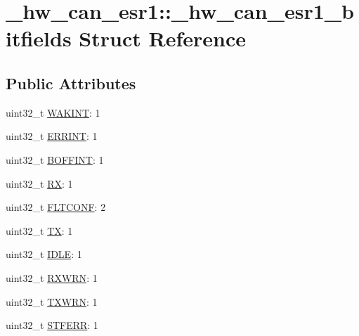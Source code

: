 \hypertarget{struct__hw__can__esr1_1_1__hw__can__esr1__bitfields}{}\section{\+\_\+hw\+\_\+can\+\_\+esr1\+:\+:\+\_\+hw\+\_\+can\+\_\+esr1\+\_\+bitfields Struct Reference}
\label{struct__hw__can__esr1_1_1__hw__can__esr1__bitfields}
\subsection*{Public Attributes}
\begin{DoxyCompactItemize}
\item 
uint32\+\_\+t \hyperlink{struct__hw__can__esr1_1_1__hw__can__esr1__bitfields_af22efeca0789da9a46947084175f9d2e}{W\+A\+K\+I\+NT}\+: 1
\item 
uint32\+\_\+t \hyperlink{struct__hw__can__esr1_1_1__hw__can__esr1__bitfields_a8e27f92e5c072273a0a510ce65bfd703}{E\+R\+R\+I\+NT}\+: 1
\item 
uint32\+\_\+t \hyperlink{struct__hw__can__esr1_1_1__hw__can__esr1__bitfields_a704fb456f255686bf4bac33249747e39}{B\+O\+F\+F\+I\+NT}\+: 1
\item 
uint32\+\_\+t \hyperlink{struct__hw__can__esr1_1_1__hw__can__esr1__bitfields_aeec6fc0114b6c72a218fad63d47f1e59}{RX}\+: 1
\item 
uint32\+\_\+t \hyperlink{struct__hw__can__esr1_1_1__hw__can__esr1__bitfields_a512e48d3fa0df0df9bed93532473d2b6}{F\+L\+T\+C\+O\+NF}\+: 2
\item 
uint32\+\_\+t \hyperlink{struct__hw__can__esr1_1_1__hw__can__esr1__bitfields_a860c19cb8170407bbeaad62dac9d7849}{TX}\+: 1
\item 
uint32\+\_\+t \hyperlink{struct__hw__can__esr1_1_1__hw__can__esr1__bitfields_a29e60f0fa2e201d7b4bccba13fb92568}{I\+D\+LE}\+: 1
\item 
uint32\+\_\+t \hyperlink{struct__hw__can__esr1_1_1__hw__can__esr1__bitfields_a13a042dab7d53725d9dafea386492918}{R\+X\+W\+RN}\+: 1
\item 
uint32\+\_\+t \hyperlink{struct__hw__can__esr1_1_1__hw__can__esr1__bitfields_ab54299ef7bafabf9d29b4d4efac3ea7e}{T\+X\+W\+RN}\+: 1
\item 
uint32\+\_\+t \hyperlink{struct__hw__can__esr1_1_1__hw__can__esr1__bitfields_a1d672586efd2f4c94f066987ea75ddd4}{S\+T\+F\+E\+RR}\+: 1
\item 

\end{DoxyCompactItemize}
